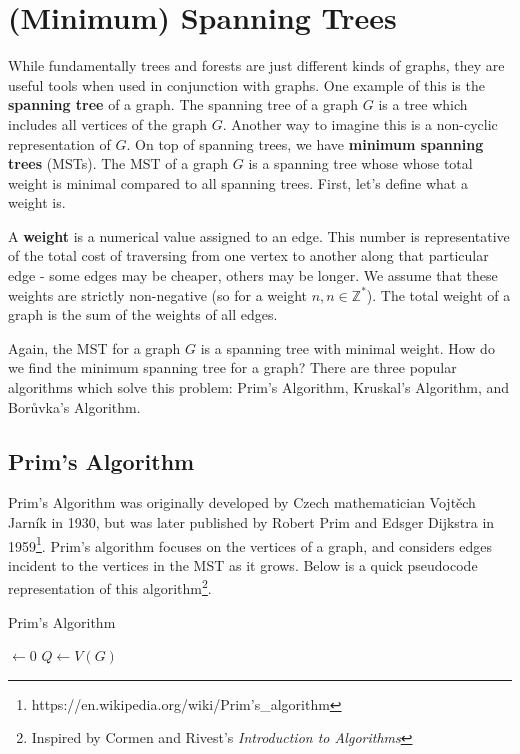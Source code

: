 \section{(Minimum) Spanning Trees}
While fundamentally trees and forests are just different kinds of graphs, they are useful tools when used in conjunction with graphs. One example of this is the \textbf{spanning tree} of a graph. The spanning tree of a graph $G$ is a tree which includes all vertices of the graph $G$. Another way to imagine this is a non-cyclic representation of $G$. On top of spanning trees, we have \textbf{minimum spanning trees} (MSTs). The MST of a graph $G$ is a spanning tree whose whose total weight is minimal compared to all spanning trees. First, let's define what a weight is.

A \textbf{weight} is a numerical value assigned to an edge. This number is representative of the total cost of traversing from one vertex to another along that particular edge - some edges may be cheaper, others may be longer. We assume that these weights are strictly non-negative (so for a weight $n, n \in \mathbb{Z}^*$). The total weight of a graph is the sum of the weights of all edges.

Again, the MST for a graph $G$ is a spanning tree with minimal weight. How do we find the minimum spanning tree for a graph? There are three popular algorithms which solve this problem: Prim's Algorithm, Kruskal's Algorithm, and Bor\r{u}vka's Algorithm.
\subsection{Prim's Algorithm}
Prim's Algorithm was originally developed by Czech mathematician Vojt\v{e}ch Jarn\'{i}k in 1930, but was later published by Robert Prim and Edsger Dijkstra in 1959\footnote{https://en.wikipedia.org/wiki/Prim's\_algorithm}. Prim's algorithm focuses on the vertices of a graph, and considers edges incident to the vertices in the MST as it grows. Below is a quick pseudocode representation of this algorithm\footnote{Inspired by Cormen and Rivest's \emph{Introduction to Algorithms}}.

\begin{algorithm}
    \DontPrintSemicolon
    \caption{Prim's Algorithm}


     $\gets 0$\;
    $Q \gets V(G)$\;
\end{algorithm}

